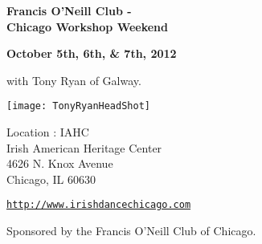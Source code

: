 \begin{center}
{\Large\textbf{Francis O'Neill Club - \\ Chicago Workshop Weekend}}\\ 
\end{center}

\begin{center}
\textbf{October 5th, 6th, \&  7th, 2012} 
\end{center}

\vspace*{0.25em}
with Tony Ryan of Galway.

\vspace*{0.45em}
\begin{center}
\texttt{[image: TonyRyanHeadShot]}
\end{center}

\vspace*{2.5em}
Location : IAHC\\
Irish American Heritage Center\\
4626 N. Knox Avenue\\
Chicago, IL  60630 

\vspace*{2em}
\href{http://www.irishdancechicago.com}{\tt http://www.irishdancechicago.com} 

{\small Sponsored by the Francis O'Neill Club of Chicago.}
